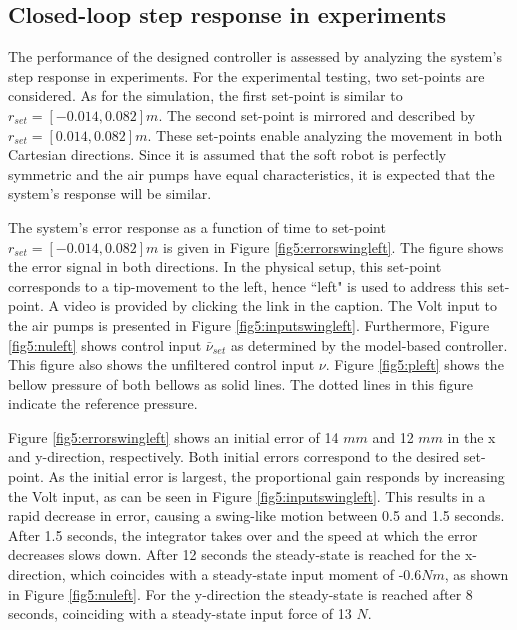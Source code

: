 \subsection*{Closed-loop step response in experiments}


The performance of the designed controller is assessed by analyzing the system's step response in experiments. For the experimental testing, two set-points are considered. As for the simulation, the first set-point is similar to $r_{set} = [-0.014,0.082] m$. The second set-point is mirrored and described by $r_{set} = [0.014,0.082] m$. These set-points enable analyzing the movement in both Cartesian directions. Since it is assumed that the soft robot is perfectly symmetric and the air pumps have equal characteristics, it is expected that the system's response will be similar.

The system's error response as a function of time to set-point $r_{set} = [-0.014,0.082] m$ is given in Figure \ref{fig5:errorswingleft}. The figure shows the error signal in both directions. In the physical setup, this set-point corresponds to a tip-movement to the left, hence ``left"  is used to address this set-point. A video is provided by clicking the link in the caption. The Volt input to the air pumps is presented in Figure \ref{fig5:inputswingleft}. Furthermore, Figure \ref{fig5:nuleft} shows control input $\bar{\nu}_{set}$ as determined by the model-based controller. This figure also shows the unfiltered control input $\nu$. Figure \ref{fig5:pleft} shows the bellow pressure of both bellows as solid lines. The dotted lines in this figure indicate the reference pressure.

Figure \ref{fig5:errorswingleft} shows an initial error of 14 $mm$ and 12 $mm$ in the x and y-direction, respectively. Both initial errors correspond to the desired set-point. As the initial error is largest, the proportional gain responds by increasing the Volt input, as can be seen in Figure \ref{fig5:inputswingleft}. This results in a rapid decrease in error, causing a swing-like motion between 0.5 and 1.5 seconds. After 1.5 seconds, the integrator takes over and the speed at which the error decreases slows down. After 12 seconds the steady-state is reached for the x-direction, which coincides with a steady-state input moment of -0.6$Nm$, as shown in Figure \ref{fig5:nuleft}. For the y-direction the steady-state is reached after 8 seconds, coinciding with a steady-state input force of 13 $N$. 


